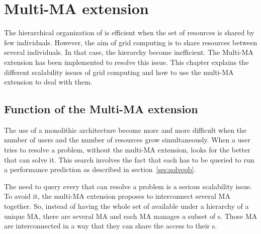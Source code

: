 \chapter{Multi-MA extension}
\label{ch:multiMAextension}

The hierarchical organization of \diet is efficient when the set of
resources is shared by few individuals. However, the aim of grid
computing is to share resources between several individuals. In that
case, the \diet hierarchy become inefficient. The Multi-MA extension
has been implemented to resolve this issue. This chapter explains the
different scalability issues of grid computing and how to use the
multi-MA extension to deal with them.

\section{Function of the Multi-MA extension}

The use of a monolithic architecture become more and more difficult
when the number of users and the number of resources grow
simultaneously. When a user tries to resolve a problem, without the
multi-MA extension, \diet looks for the better \sed that can solve
it. This search involves the fact that each \sed has to be queried to
run a performance prediction as described in section~\ref{sec:solvepb}.

The need to query every \sed that can resolve a problem is a serious
scalability issue. To avoid it, the multi-MA extension proposes to
interconnect several MA together. So, instead of having the whole set
of \sed available under a hierarchy of a unique MA, there are several
MA and each MA manages a subset of {\sed}s. Those MA are
interconnected in a way that they can share the access to their
{\sed}s.

